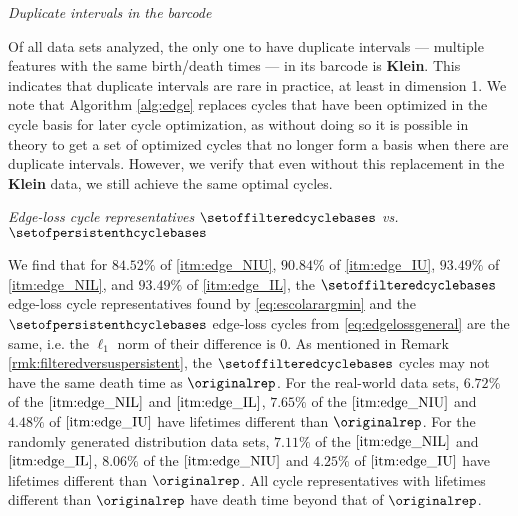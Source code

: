 \noindent \emph{Duplicate intervals in the barcode}

Of all data sets analyzed, the only one to have duplicate intervals --- multiple features with the same birth/death times --- in its barcode is \textbf{Klein}. This indicates that duplicate intervals are rare in practice, at least in dimension 1. We note that Algorithm \ref{alg:edge} replaces cycles that have been optimized in the cycle basis for later cycle optimization, as without doing so it is possible in theory to get a set of optimized cycles that no longer form a basis when there are duplicate intervals. However, we verify that even without this replacement in the \textbf{Klein} data, we still achieve the same optimal cycles. 

 \noindent \emph{Edge-loss cycle representatives $\setoffilteredcyclebases$ vs. $\setofpersistenthcyclebases$}

We find that for $84.52\%$ of \ref{itm:edge_NIU}, $90.84\%$ of \ref{itm:edge_IU}, $93.49\%$ of \ref{itm:edge_NIL}, and $93.49\%$ of \ref{itm:edge_IL}, the $\setoffilteredcyclebases$ edge-loss cycle representatives found by \pr \eqref{eq:escolarargmin} and the $\setofpersistenthcyclebases$ edge-loss cycles from \pr \eqref{eq:edgelossgeneral} are the same, i.e. the $\ell_1$ norm of their difference is $0$. As mentioned in Remark \ref{rmk:filteredversuspersistent}, the $\setoffilteredcyclebases$ cycles may not have the same death time as $\originalrep$. For the real-world data sets, $6.72\%$ of the $\eqref{itm:edge_NIL}$ and $\eqref{itm:edge_IL}$,  $7.65\%$ of the $\eqref{itm:edge_NIU}$ and $4.48\%$ of $\eqref{itm:edge_IU}$ have lifetimes different than $\originalrep$. For the randomly generated distribution data sets, $7.11\%$ of the $\eqref{itm:edge_NIL}$ and $\eqref{itm:edge_IL}$,  $8.06\%$ of the $\eqref{itm:edge_NIU}$ and $4.25\%$ of $\eqref{itm:edge_IU}$ have lifetimes different than $\originalrep$. All cycle representatives with lifetimes different than $\originalrep$ have death time beyond that of $\originalrep$.




